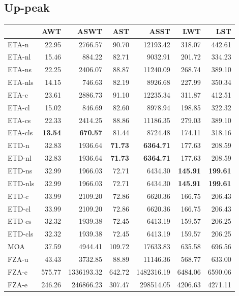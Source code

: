 \documentclass{UoYCSproject}
\begin{document}
\subsection{Up-peak}

\begin{tabular}{l | r r r r r r}
	& AWT & ASWT & AST & ASST & LWT & LST \\
	\hline
	ETA-n & 22.95 & 2766.57 & 90.70 & 12193.42 & 318.07 & 442.61 \\
	ETA-nl & 15.46 & 884.22 & 82.71 & 9032.91 & 201.72 & 334.23 \\
	ETA-ns & 22.25 & 2406.07 & 88.87 & 11240.09 & 268.74 & 389.10 \\
	ETA-nls & 14.15 & 746.63 & 82.19 & 8926.68 & 227.99 & 350.34 \\
	ETA-c & 23.61 & 2886.73 & 91.10 & 12235.34 & 311.87 & 412.51 \\
	ETA-cl & 15.02 & 846.69 & 82.60 & 8978.94 & 198.85 & 322.32 \\
	ETA-cs & 22.33 & 2414.25 & 88.86 & 11186.35 & 279.03 & 389.10 \\
	ETA-cls & \textbf{13.54} & \textbf{670.57} & 81.44 & 8724.48 & 174.11 & 318.16 \\
	\hline
	ETD-n & 32.83 & 1936.64 & \textbf{71.73} & \textbf{6364.71} & 177.63 & 208.59 \\
	ETD-nl & 32.83 & 1936.64 & \textbf{71.73} & \textbf{6364.71} & 177.63 & 208.59 \\
	ETD-ns & 32.99 & 1966.03 & 72.71 & 6434.30 & \textbf{145.91} & \textbf{199.61} \\
	ETD-nls & 32.99 & 1966.03 & 72.71 & 6434.30 & \textbf{145.91} & \textbf{199.61} \\
	ETD-c & 33.99 & 2109.20 & 72.86 & 6620.36 & 166.75 & 206.43 \\
	ETD-cl & 33.99 & 2109.20 & 72.86 & 6620.36 & 166.75 & 206.43 \\
	ETD-cs & 32.32 & 1939.38 & 72.45 & 6413.19 & 159.57 & 206.25 \\
	ETD-cls & 32.32 & 1939.38 & 72.45 & 6413.19 & 159.57 & 206.25 \\
	\hline
	MOA & 37.59 & 4944.41 & 109.72 & 17633.83 & 635.58 & 696.56 \\
	\hline
	FZA-u & 43.43 & 3732.85 & 88.89 & 11146.36 & 568.77 & 633.00 \\
	FZA-c & 575.77 & 1336193.32 & 642.72 & 1482316.19 & 6484.06 & 6590.06 \\
	FZA-e & 246.26 & 246866.23 & 307.47 & 298514.05 & 4206.63 & 4271.11
\end{tabular}
\end{document}
